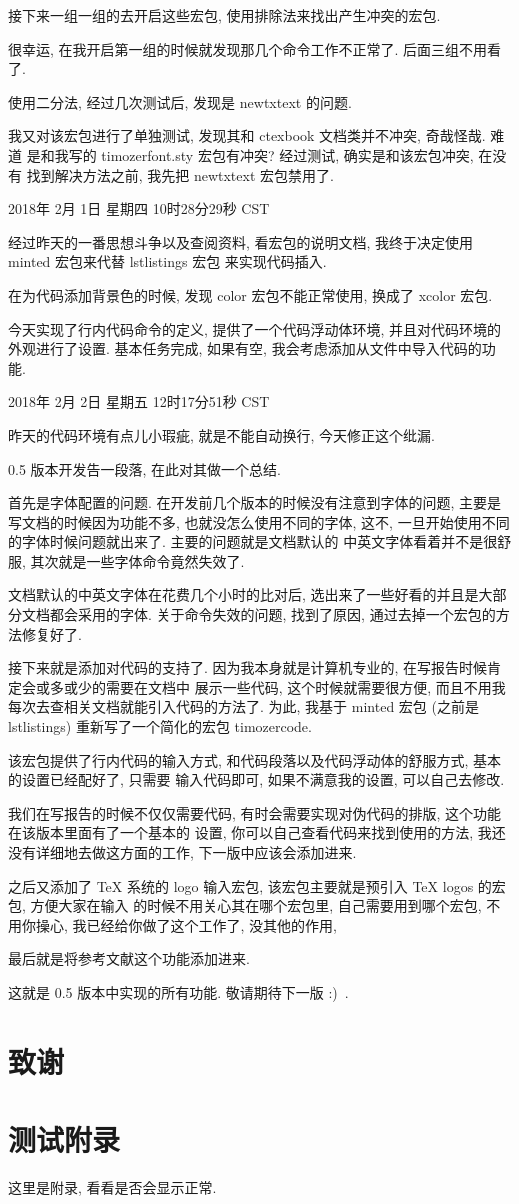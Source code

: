 \documentclass{cugrep}
\begin{document}
接下来一组一组的去开启这些宏包, 使用排除法来找出产生冲突的宏包. 

很幸运, 在我开启第一组的时候就发现那几个命令工作不正常了. 后面三组不用看了.

使用二分法, 经过几次测试后, 发现是 newtxtext 的问题. 

我又对该宏包进行了单独测试, 发现其和 ctexbook 文档类并不冲突, 奇哉怪哉. 难道
是和我写的 timozerfont.sty 宏包有冲突? 经过测试, 确实是和该宏包冲突, 在没有
找到解决方法之前, 我先把 newtxtext 宏包禁用了. 

2018年 2月 1日 星期四 10时28分29秒 CST

经过昨天的一番思想斗争以及查阅资料, 看宏包的说明文档, 我终于决定使用 minted 宏包来代替 lstlistings 宏包
来实现代码插入.

在为代码添加背景色的时候, 发现 color 宏包不能正常使用, 换成了 xcolor 宏包. 

今天实现了行内代码命令的定义, 提供了一个代码浮动体环境,
并且对代码环境的外观进行了设置. 基本任务完成, 如果有空,
我会考虑添加从文件中导入代码的功能.

2018年 2月 2日 星期五 12时17分51秒 CST

昨天的代码环境有点儿小瑕疵, 就是不能自动换行, 今天修正这个纰漏.

0.5 版本开发告一段落, 在此对其做一个总结.

首先是字体配置的问题. 在开发前几个版本的时候没有注意到字体的问题, 主要是写文档的时候因为功能不多,
也就没怎么使用不同的字体, 这不, 一旦开始使用不同的字体时候问题就出来了. 主要的问题就是文档默认的
中英文字体看着并不是很舒服, 其次就是一些字体命令竟然失效了. 

文档默认的中英文字体在花费几个小时的比对后, 选出来了一些好看的并且是大部分文档都会采用的字体. 
关于命令失效的问题, 找到了原因, 通过去掉一个宏包的方法修复好了.

接下来就是添加对代码的支持了. 因为我本身就是计算机专业的, 在写报告时候肯定会或多或少的需要在文档中
展示一些代码, 这个时候就需要很方便, 而且不用我每次去查相关文档就能引入代码的方法了. 为此, 我基于
minted 宏包 (之前是 lstlistings) 重新写了一个简化的宏包 timozercode. 

该宏包提供了行内代码的输入方式, 和代码段落以及代码浮动体的舒服方式, 基本的设置已经配好了, 只需要
输入代码即可, 如果不满意我的设置, 可以自己去修改.

我们在写报告的时候不仅仅需要代码, 有时会需要实现对伪代码的排版, 这个功能在该版本里面有了一个基本的
设置, 你可以自己查看代码来找到使用的方法, 我还没有详细地去做这方面的工作, 下一版中应该会添加进来. 

之后又添加了 \TeX{} 系统的 logo 输入宏包, 该宏包主要就是预引入 \TeX{} logos 的宏包, 方便大家在输入
的时候不用关心其在哪个宏包里, 自己需要用到哪个宏包, 不用你操心, 我已经给你做了这个工作了,
没其他的作用,

最后就是将参考文献这个功能添加进来. 

这就是 0.5 版本中实现的所有功能. 敬请期待下一版 :)~.
\backmatter

\chapter{致谢}

\appendix
\chapter{测试附录}
这里是附录, 看看是否会显示正常.

\backmatter 
\end{document}
